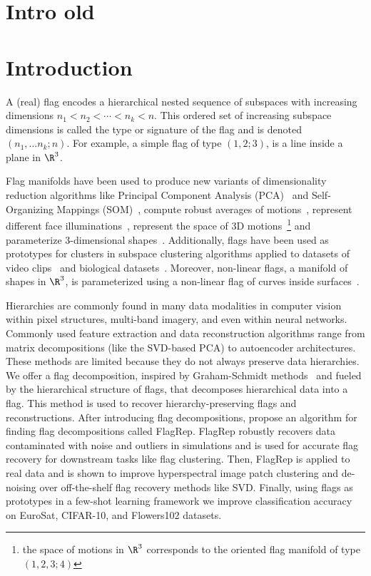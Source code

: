 \section{Intro old}
\section{Introduction}\label{sec:intro}
A (real) flag encodes a hierarchical nested sequence of subspaces with increasing dimensions $n_1 < n_2 < \cdots < n_k < n$. This ordered set of increasing subspace dimensions is called the type or signature of the flag and is denoted $(n_1,\dots n_k;n)$. For example, a simple flag of type $(1,2;3)$, is a line inside a plane in $\R^3$.

Flag manifolds have been used to produce new variants of dimensionality reduction algorithms like Principal Component Analysis (PCA)~\cite{pennec2018barycentric, mankovich2024fun, szwagier2024curseisotropyprincipalcomponents} and Self-Organizing Mappings (SOM)~\cite{ma2022self}, compute robust averages of motions~\cite{Mankovich_2023_ICCV}, represent different face illuminations~\cite{draper2014flag, Mankovich_2023_ICCV}, represent the space of 3D motions~\cite{Mankovich_2023_ICCV}\footnote{the space of motions in $\R^3$ corresponds to the oriented flag manifold of type $(1,2,3;4)$} and parameterize $3$-dimensional shapes~\cite{ciuclea2023shape}. Additionally, flags have been used as prototypes for clusters in subspace clustering algorithms applied to datasets of video clips~\cite{marrinan2014finding, mankovich2022flag, Mankovich_2023_ICCV} and biological datasets~\cite{mankovich2023module,mankovich2023subspace}. Moreover, non-linear flags, a manifold of shapes in $\R^3$, is parameterized using a non-linear flag of curves inside surfaces~\cite{ciuclea2023shape}.

Hierarchies are commonly found in many data modalities in computer vision within pixel structures, multi-band imagery, and even within neural networks. Commonly used feature extraction and data reconstruction algorithms range from matrix decompositions (like the SVD-based PCA) to autoencoder architectures. These methods are limited because they do not always preserve data hierarchies. We offer a flag decomposition, inspired by Graham-Schmidt methods~\cite{jalby1991stability,ida2019qr,apriansyah2022parallel} and fueled by the hierarchical structure of flags, that decomposes hierarchical data into a flag. This method is used to recover hierarchy-preserving flags and reconstructions. After introducing flag decompositions, propose an algorithm for finding flag decompositions called FlagRep. FlagRep robustly recovers data contaminated with noise and outliers in simulations and is used for accurate flag recovery for downstream tasks like flag clustering. Then, FlagRep is applied to real data and is shown to improve hyperspectral image patch clustering and de-noising over off-the-shelf flag recovery methods like SVD. Finally, using flags as prototypes in a few-shot learning framework we improve classification accuracy on EuroSat, CIFAR-10, and Flowers102 datasets.




